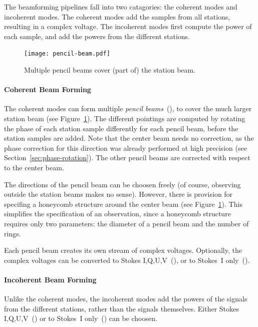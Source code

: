 The beamforming pipelines fall into two catagories: the coherent modes and
incoherent modes.
The coherent modes add the samples from all stations, resulting in a
complex voltage.
The incoherent modes first compute the power of each sample, and add the
powers from the different stations.


\begin{figure}
\vspace{-9mm}
\begin{center}
\texttt{[image: pencil-beam.pdf]}
\end{center}
\caption{Multiple pencil beams cover (part of) the station beam.\vspace{-5mm}}
\label{fig:pencil-beams}
\end{figure}
\paragraph{Coherent Beam Forming}
The coherent modes can form multiple \emph{pencil beams\/}~(),
to cover the much larger station beam (see Figure~\ref{fig:pencil-beams}).
The different pointings are computed by rotating the phase of each station
sample differently for each pencil beam, before the station samples are added.
Note that the center beam needs no correction, as the phase correction for
this direction was already performed at high precision (see
Section~\ref{sec:phase-rotation}).
The other pencil beams are corrected with respect to the center beam.

The directions of the pencil beam can be choosen freely (of course, observing
outside the station beams makes no sense).
However, there is provision for specifing a honeycomb structure around the
center beam (see Figure~\ref{fig:pencil-beams}).
This simplifies the specification of an observation, since a honeycomb structure
requires only two parameters: the diameter of a pencil beam and the number
of rings.

Each pencil beam creates its own stream of complex voltages.
Optionally, the complex voltages can be converted to Stokes
I,Q,U,V~(), or to Stokes~I only~().


\paragraph{Incoherent Beam Forming}
Unlike the coherent modes, the incoherent modes add the powers of the signals
from the different stations, rather than the signals themselves.
Either Stokes I,Q,U,V~() or to Stokes~I
only~() can be choosen.


